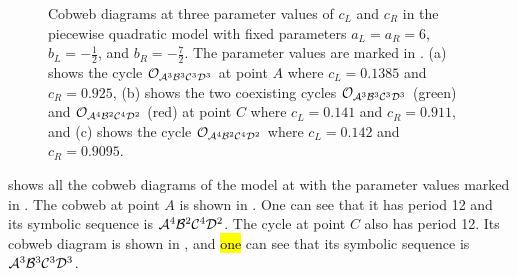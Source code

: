 \begin{figure}
	\centering
	\caption[Cobweb diagrams of the skewed piecewise quadratic model]{
		Cobweb diagrams at three parameter values of $c_L$ and $c_R$ in the piecewise quadratic model with fixed parameters $a_L = a_R = 6$, $b_L = -\frac{1}{2}$, and $b_R = -\frac{7}{2}$.
		The parameter values are marked in .
		(a) shows the cycle $\mathcal{O}_{\mathcal{A}^3\mathcal{B}^3\mathcal{C}^3\mathcal{D}^3}$ at point $A$ where $c_L = 0.1385$ and $c_R = 0.925$,
		(b) shows the two coexisting cycles $\mathcal{O}_{\mathcal{A}^3\mathcal{B}^3\mathcal{C}^3\mathcal{D}^3}$ (green) and $\mathcal{O}_{\mathcal{A}^4\mathcal{B}^2\mathcal{C}^4\mathcal{D}^2}$ (red) at point $C$ where $c_L = 0.141$ and $c_R = 0.911$,
		and (c) shows the cycle $\mathcal{O}_{\mathcal{A}^4\mathcal{B}^2\mathcal{C}^4\mathcal{D}^2}$ where $c_L = 0.142$ and $c_R = 0.9095$.
	}
	\label{fig:setup.quad.skew.cobwebs}
\end{figure}

 shows all the cobweb diagrams of the model at with the parameter values marked in .
The cobweb at point $A$ is shown in .
One can see that it has period 12 and its symbolic sequence is $\mathcal{A}^4\mathcal{B}^2\mathcal{C}^4\mathcal{D}^2$.
The cycle at point $C$ also has period 12.
Its cobweb diagram is shown in , and \hl{one} can see that its symbolic sequence is $\mathcal{A}^3\mathcal{B}^3\mathcal{C}^3\mathcal{D}^3$.

